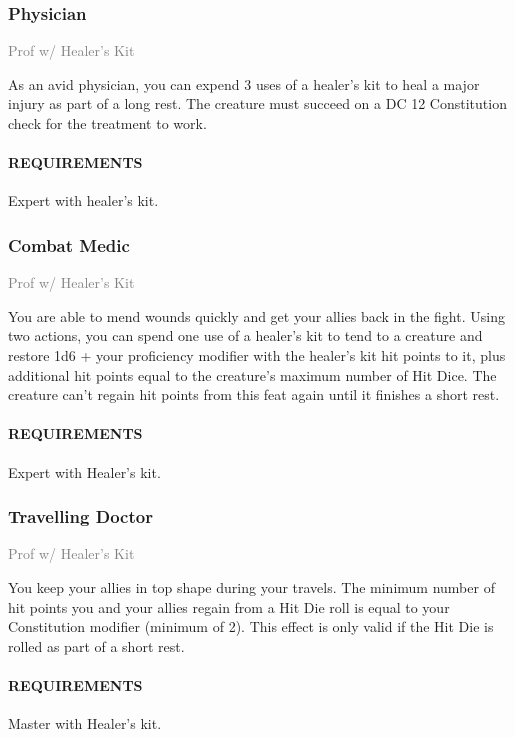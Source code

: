     \subsubsection{Physician} \label{feat::physician}
    \small{\textcolor{gray}{Prof w/ Healer's Kit}}

    \normalsize
    As an avid physician, you can expend 3 uses of a healer's kit to heal a major injury as part of a long rest.
    The creature must succeed on a DC 12 Constitution check for the treatment to work.
    \paragraph{REQUIREMENTS} Expert with healer's kit.

    \subsubsection{Combat Medic} \label{feat::combatmedic}
    \small{\textcolor{gray}{Prof w/ Healer's Kit}}

    \normalsize
    You are able to mend wounds quickly and get your allies back in the fight.
    Using two actions, you can spend one use of a healer's kit to tend to a creature and restore 1d6 + your proficiency modifier with the healer's kit hit points to it, plus additional hit points equal to the creature's maximum number of Hit Dice.
    The creature can't regain hit points from this feat again until it finishes a short rest.
    \paragraph{REQUIREMENTS} Expert with Healer's kit.

    \subsubsection{Travelling Doctor} \label{feat::travellingdoctor}
    \small{\textcolor{gray}{Prof w/ Healer's Kit}}

    \normalsize
    You keep your allies in top shape during your travels.
    The minimum number of hit points you and your allies regain from a Hit Die roll is equal to your Constitution modifier (minimum of 2).
    This effect is only valid if the Hit Die is rolled as part of a short rest.
    \paragraph{REQUIREMENTS} Master with Healer's kit.

